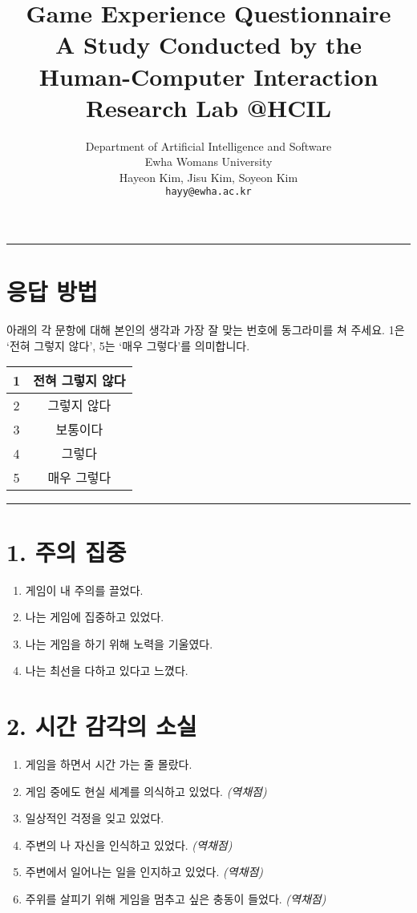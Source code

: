 \documentclass[12pt]{article}
\title{\textbf{Game Experience Questionnaire}\\[0.5em]
\large A Study Conducted by the Human-Computer Interaction Research Lab @HCIL}
\author{Department of Artificial Intelligence and Software\\
Ewha Womans University\\
Hayeon Kim, Jisu Kim, Soyeon Kim\\
\texttt{hayy@ewha.ac.kr}}
\begin{document}
\maketitle
\hrule
\vspace{0.5cm}

\section*{응답 방법}
아래의 각 문항에 대해 본인의 생각과 가장 잘 맞는 번호에 동그라미를 쳐 주세요.  
1은 ‘전혀 그렇지 않다’, 5는 ‘매우 그렇다’를 의미합니다.

\vspace{0.5cm}

\begin{center}
\begin{tabular}{|c|c|}
\hline
1 & 전혀 그렇지 않다 \\
\hline
2 & 그렇지 않다 \\
\hline
3 & 보통이다 \\
\hline
4 & 그렇다 \\
\hline
5 & 매우 그렇다 \\
\hline
\end{tabular}
\end{center}

\vspace{0.5cm}
\hrule
\vspace{0.5cm}

\section*{1. 주의 집중}

\begin{enumerate}[label=\arabic*.]
  \item 게임이 내 주의를 끌었다.
  \item 나는 게임에 집중하고 있었다.
  \item 나는 게임을 하기 위해 노력을 기울였다.
  \item 나는 최선을 다하고 있다고 느꼈다.
\end{enumerate}

\section*{2. 시간 감각의 소실}

\begin{enumerate}[resume]
  \item 게임을 하면서 시간 가는 줄 몰랐다.
  \item 게임 중에도 현실 세계를 의식하고 있었다. \textit{(역채점)}
  \item 일상적인 걱정을 잊고 있었다.
  \item 주변의 나 자신을 인식하고 있었다. \textit{(역채점)}
  \item 주변에서 일어나는 일을 인지하고 있었다. \textit{(역채점)}
  \item 주위를 살피기 위해 게임을 멈추고 싶은 충동이 들었다. \textit{(역채점)}
\end{enumerate}
\end{document}

